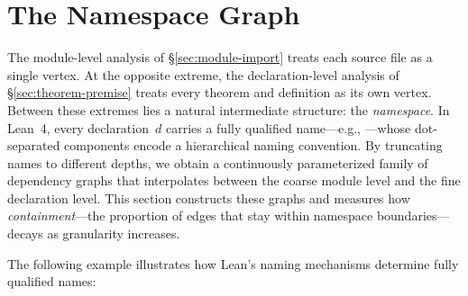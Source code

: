 \section{The Namespace Graph}
\label{sec:namespace-graph}

The module-level analysis of \S\ref{sec:module-import} treats each source file as a single vertex. At the opposite extreme, the declaration-level analysis of \S\ref{sec:theorem-premise} treats every theorem and definition as its own vertex. Between these extremes lies a natural intermediate structure: the \emph{namespace}. In Lean~4, every declaration~$d$ carries a fully qualified name---e.g., ---whose dot-separated components encode a hierarchical naming convention. By truncating names to different depths, we obtain a continuously parameterized family of dependency graphs that interpolates between the coarse module level and the fine declaration level. This section constructs these graphs and measures how \emph{containment}---the proportion of edges that stay within namespace boundaries---decays as granularity increases.

The following example illustrates how Lean's naming mechanisms determine fully qualified names:


